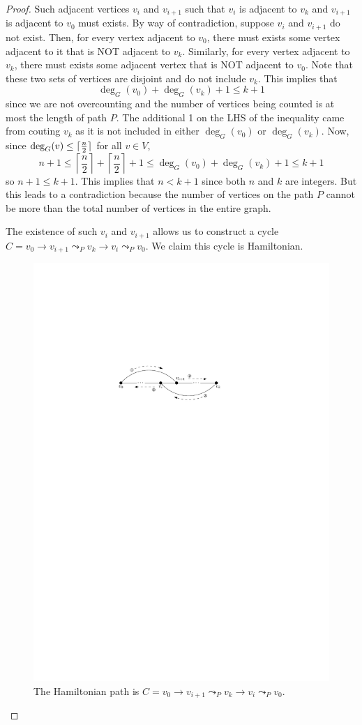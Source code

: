 \begin{proof}
    Such adjacent vertices $v_i$ and $v_{i+1}$ such that $v_i$ is adjacent to $v_k$ and $v_{i+1}$ is adjacent to $v_0$ must exists. By way of contradiction, suppose $v_i$ and $v_{i+1}$ do not exist. Then, for every vertex adjacent to $v_0$, there must exists some vertex adjacent to it that is NOT adjacent to $v_k$. Similarly, for every vertex adjacent to $v_k$, there must exists some adjacent vertex that is NOT adjacent to $v_0$. Note that these two sets of vertices are disjoint and do not include $v_k$. This implies that
    $$
    \deg_G(v_0) + \deg_G(v_k) + 1 \leq k + 1
    $$
    since we are not overcounting and the number of vertices being counted is at most the length of path $P$. The additional 1 on the LHS of the inequality came from couting $v_k$ as it is not included in either $\deg_G(v_0)$ or $\deg_G(v_k)$. Now, since $\deg_G(v) \leq \lceil\frac{n}{2}\rceil$ for all $v \in V$,
    $$
    n + 1 \leq \left\lceil \frac{n}{2} \right\rceil + \left\lceil \frac{n}{2} \right\rceil + 1 \leq \deg_G(v_0) + \deg_G(v_k) + 1 \leq k + 1
    $$
    so $n + 1 \leq k+1$. This implies that $n < k+1$ since both $n$ and $k$ are integers. But this leads to a contradiction because the number of vertices on the path $P$ cannot be more than the total number of vertices in the entire graph.

    The existence of such $v_i$ and $v_{i+1}$ allows us to construct a cycle $C = v_0 \to v_{i+1} \leadsto_{P} v_k \to v_i \leadsto_{P} v_0$. We claim this cycle is Hamiltonian.

    \begin{figure}[htbp]
        \centering
        \includegraphics[width=0.4\linewidth]{figures/dirac-thm-hamcycle.pdf}
        \caption{The Hamiltonian path is $C = v_0 \to v_{i+1} \leadsto_{P} v_k \to v_i \leadsto_{P} v_0$.}
        \label{fig:dirac-thm-hamcycle}
    \end{figure}


\end{proof}
